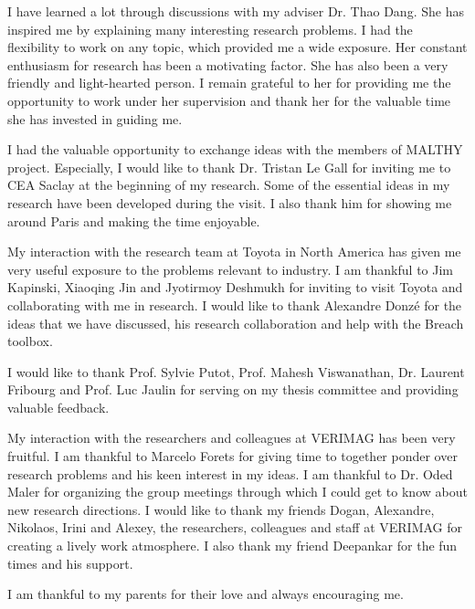 I have learned a lot through discussions with my adviser Dr. Thao
Dang.  She has inspired me by explaining many interesting research
problems.  I had the flexibility to work on any topic, which provided
me a wide exposure.  Her constant enthusiasm for research has been a
motivating factor.  She has also been a very friendly and
light-hearted person.  I remain grateful to her for providing me the
opportunity to work under her supervision and thank her for the
valuable time she has invested in guiding me.

I had the valuable opportunity to exchange ideas with the members of
MALTHY project.  Especially, I would like to thank Dr. Tristan Le Gall
for inviting me to CEA Saclay at the beginning of my research.  Some
of the essential ideas in my research have been developed during the
visit.  I also thank him for showing me around Paris and making the
time enjoyable.

My interaction with the research team at Toyota in North America has
given me very useful exposure to the problems relevant to industry.  I
am thankful to Jim Kapinski, Xiaoqing Jin and Jyotirmoy Deshmukh for
inviting to visit Toyota and collaborating with me in research.  I
would like to thank Alexandre Donz\'e for the ideas that we have
discussed, his research collaboration and help with the Breach
toolbox.

I would like to thank Prof. Sylvie Putot, Prof. Mahesh Viswanathan,
Dr. Laurent Fribourg and Prof. Luc Jaulin for serving on my thesis
committee and providing valuable feedback.

My interaction with the researchers and colleagues at VERIMAG has been
very fruitful.  I am thankful to Marcelo Forets for giving time to
together ponder over research problems and his keen interest in my
ideas.  I am thankful to Dr. Oded Maler for organizing the group
meetings through which I could get to know about new research
directions.  I would like to thank my friends Dogan, Alexandre,
Nikolaos, Irini and Alexey, the researchers, colleagues and staff at
VERIMAG for creating a lively work atmosphere.  I also thank my friend
Deepankar for the fun times and his support.


I am thankful to my parents for their love and always encouraging me.
